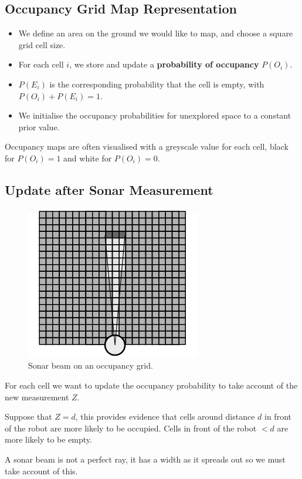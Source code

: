 \documentclass[11pt]{article}
\begin{document}
\subsection{Occupancy Grid Map Representation}
\begin{itemize}
  \item We define an area on the ground we would like to map, and choose a square grid cell size.
  \item For each cell $i$, we store and update a \textbf{probability of occupancy} $P(O_i)$.
  \item $P(E_i)$ is the corresponding probability that the cell is empty, with $P(O_i) + P(E_i) = 1$.
  \item We initialise the occupancy probabilities for unexplored space to a constant prior value.
\end{itemize}
Occupancy maps are often visualised with a greyscale value for each cell, black for $P(O_i) = 1$ and white for $P(O_i) = 0$.

\subsection{Update after Sonar Measurement}
\begin{figure}[h]
  \caption{Sonar beam on an occupancy grid.}
  \includegraphics[scale=0.4]{sonarbeam}
  \centering
\end{figure}

For each cell we want to update the occupancy probability to take account of the new measurement $Z$.

Suppose that $Z = d$, this provides evidence that cells around distance $d$ in front of the robot are more likely to be occupied.
Cells in front of the robot $< d$ are more likely to be empty.

A sonar beam is not a perfect ray, it has a width as it spreads out so we must take account of this.
\end{document}

